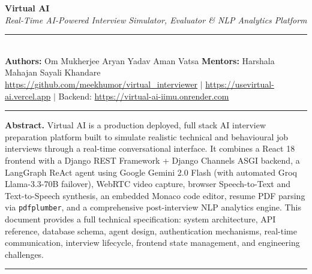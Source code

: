 \documentclass[10pt, a4paper]{article}
\begin{document}

\begin{center}
  {\Huge\bfseries\color{monodark} Virtual AI}\\[5pt]
  {\large\itshape\color{monomedium}
    Real-Time AI-Powered Interview Simulator, Evaluator \& NLP Analytics Platform
  }\\[9pt]
  \noindent\rule{\linewidth}{1.2pt}\\[6pt]
  {\small
    \textbf{Authors:} Om Mukherjee \quad Aryan Yadav \quad Aman Vatsa
    \quad\textbullet\quad
    \textbf{Mentors:} Harshala Mahajan \quad Sayali Khandare
  }\\[3pt]
  {\small\color{monolight}
    \url{https://github.com/meekhumor/virtual_interviewer}
    \quad $|$ \quad
    \url{https://usevirtual-ai.vercel.app}
    \quad $|$ \quad
    Backend: \url{https://virtual-ai-iimu.onrender.com}
  }\\[8pt]
  \noindent\rule{\linewidth}{0.5pt}
\end{center}

\noindent\textbf{Abstract.}\quad
Virtual AI is a production deployed, full stack AI interview preparation
platform built to simulate realistic technical and behavioural job interviews
through a real-time conversational interface. It combines a React 18 frontend
with a Django REST Framework + Django Channels ASGI backend, a LangGraph
ReAct agent using Google Gemini 2.0 Flash (with automated Groq Llama-3.3-70B
failover), WebRTC video capture, browser Speech-to-Text and Text-to-Speech
synthesis, an embedded Monaco code editor, resume PDF parsing via
\texttt{pdfplumber}, and a comprehensive post-interview NLP analytics engine.
This document provides a full technical specification: system architecture,
API reference, database schema, agent design, authentication mechanisms,
real-time communication, interview lifecycle, frontend state management, and
engineering challenges.

\vspace{6pt}
\noindent\rule{\linewidth}{0.4pt}
\vspace{4pt}
\end{document}
